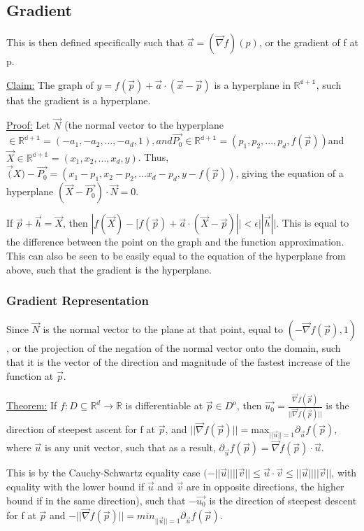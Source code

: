 \documentclass[11 pt, twoside]{article}
\begin{document}
\subsection{Gradient}

This is then defined specifically such that $\vec{a} = (\vec{\nabla}f)(p)$, or the gradient of f at p.

\underline{Claim:}
The graph of $y = f(\vec{p}) + \vec{a} \cdot (\vec{x} - \vec{p})$ is a hyperplane in $\mathbb{R^{d+1}}$, such that the gradient is a hyperplane.

\underline{Proof:}
Let $\vec{N}$ (the normal vector to the hyperplane$ \in \mathbb{R^{d+1}} = (-a_1, -a_2, ..., -a_d, 1), and \vec{P_0} \in \mathbb{R^{d+1}} = (p_1, p_2, ..., p_d, f(\vec{p}))$and $\vec{X} \in \mathbb{R^{d+1}} = (x_1, x_2, ..., x_d, y)$. Thus, $\vec(X) - \vec{P_0} = (x_1 - p_1, x_2 - p_2, ... x_d - p_d, y - f(\vec{p}))$, giving the equation of a hyperplane $(\vec{X} - \vec{P_0}) \cdot \vec{N} = 0$.

If $\vec{p} + \vec{h} = \vec{X}$, then $|f(\vec{X}) - [f(\vec{p}) + \vec{a} \cdot (\vec{X} - \vec{p})|| < \epsilon||\vec{h}||$. This is equal to the difference between the point on the graph and the function approximation. This can also be seen to be easily equal to the equation of the hyperplane from above, such that the gradient is the hyperplane.

\subsubsection{Gradient Representation}

Since $\vec{N}$ is the normal vector to the plane at that point, equal to $(-\vec{\nabla}f(\vec{p}), 1)$, or the projection of the negation of the normal vector onto the domain, such that it is the vector of the direction and magnitude of the fastest increase of the function at $\vec{p}$.

\underline{Theorem:}
If $f:D \subseteq \mathbb{R}^d \to \mathbb{R}$ is differentiable at $\vec{p} \in D^o$, then $\vec{u_0} = \frac{\vec{\nabla}f(\vec{p})}{||\vec{\nabla}f(\vec{p})||}$ is the direction of steepest ascent for f at $\vec{p}$, and $||\vec{\nabla}f(\vec{p})|| = $max$_{||\vec{u}||=1} \partial_{\vec{u}} f(\vec{p})$, where $\vec{u}$ is any unit vector, such that as a result, $\partial_{\vec{u}} f(\vec{p}) = \vec{\nabla}f(\vec{p}) \cdot \vec{u}$.

This is by the Cauchy-Schwartz equality case $(-||\vec{u}||||\vec{v}|| \leq \vec{u} \cdot \vec{v} \leq ||\vec{u}||||\vec{v}||$, with equality with the lower bound if $\vec{u}$ and $\vec{v}$ are in opposite directions, the higher bound if in the same direction), such that $-\vec{u_0}$ is the direction of steepest descent for f at $\vec{p}$ and $-||\vec{\nabla}f(\vec{p})|| = min_{||\vec{u}||=1} \partial_{\vec{u}}f(\vec{p}).$ 
\end{document}
